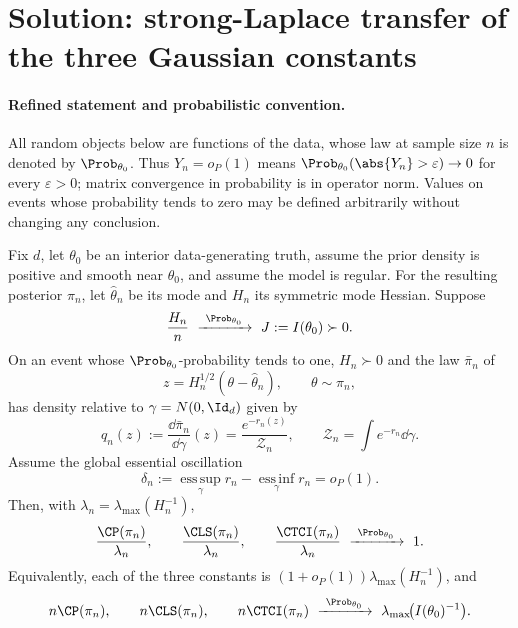 \documentclass[../main.tex]{subfiles}
\begin{document}

\section*{Solution: strong-Laplace transfer of the three Gaussian constants}
\label{sec:sol-thm-a2-target}

\paragraph{Refined statement and probabilistic convention.}
All random objects below are functions of the data, whose law at sample size $n$ is denoted by
$\Prob_{\theta_0}$.  Thus $Y_n=o_P(1)$ means
$\Prob_{\theta_0}(\abs{Y_n}>\varepsilon)\to0$ for every $\varepsilon>0$; matrix convergence in
probability is in operator norm.  Values on events whose probability tends to zero may be defined
arbitrarily without changing any conclusion.

\begin{theorem}
\label{thm:sol-a2-target}
Fix $d$, let $\theta_0$ be an interior data-generating truth, assume the prior density is positive
and smooth near $\theta_0$, and assume the model is regular.  For the resulting posterior
$\pi_n$, let $\hat\theta_n$ be its mode and $H_n$ its symmetric mode Hessian.  Suppose
\[
 \frac{H_n}{n}\ \xrightarrow{\ \Prob_{\theta_0}\ }\ J:=I(\theta_0)\succ0.
\]
On an event whose $\Prob_{\theta_0}$-probability tends to one, $H_n\succ0$ and the law
$\bar\pi_n$ of
\[
 z=H_n^{1/2}(\theta-\hat\theta_n),\qquad \theta\sim\pi_n,
\]
has density relative to $\gamma=N(0,\Id_d)$ given by
\[
 q_n(z):=\frac{\dd\bar\pi_n}{\dd\gamma}(z)
 =\frac{e^{-r_n(z)}}{\mathcal Z_n},
 \qquad
 \mathcal Z_n=\int e^{-r_n}\dd\gamma.
\]
Assume the global essential oscillation
\[
 \delta_n:=\operatorname*{ess\,sup}_{\gamma}r_n
          -\operatorname*{ess\,inf}_{\gamma}r_n
 =o_P(1).
\]
Then, with $\lambda_n=\lambda_{\max}(H_n^{-1})$,
\begin{equation}
\label{eq:sol-a2-relative-limits}
 \frac{\CP(\pi_n)}{\lambda_n},\qquad
 \frac{\CLS(\pi_n)}{\lambda_n},\qquad
 \frac{\CTCI(\pi_n)}{\lambda_n}
 \ \xrightarrow{\ \Prob_{\theta_0}\ }\ 1.
\end{equation}
Equivalently, each of the three constants is
$(1+o_P(1))\lambda_{\max}(H_n^{-1})$, and
\begin{equation}
\label{eq:sol-a2-fisher-limits}
 n\CP(\pi_n),\qquad n\CLS(\pi_n),\qquad n\CTCI(\pi_n)
 \ \xrightarrow{\ \Prob_{\theta_0}\ }\
 \lambda_{\max}\!\big(I(\theta_0)^{-1}\big).
\end{equation}
\end{theorem}
\end{document}
